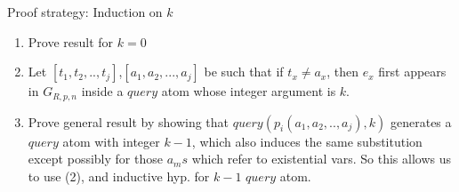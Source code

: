 \documentclass{article}
\begin{document}
Proof strategy: Induction on $k$
\begin{enumerate}
    \item Prove result for $k =0 $
    \item Let $[t_{1},t_{2},..,t_{j}]$,$[a_{1},a_{2},...,a_{j}]$ be such that if $t_{x}\neq a_{x}$, then $e_{x}$ first appears in $G_{R,p,n}$ inside a $query$ atom whose integer argument is $k$.
    \item Prove general result by showing that $query(p_{i}(a_{1},a_{2},..,a_{j}),k)$ generates a $query$ atom with integer $k-1$, which also induces the same substitution except possibly for those $a_{m}s$ which refer to existential vars. So this allows us to use (2), and inductive hyp. for $k-1$ $query$ atom.
\end{enumerate}



\end{document}
